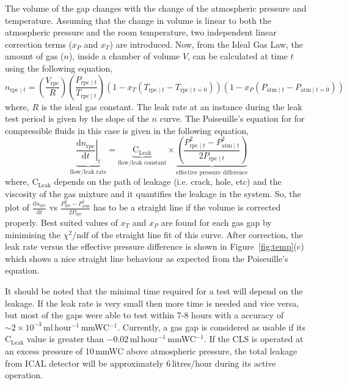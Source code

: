 \documentclass[a4paper,12pt,twoside]{article}
\begin{document}
The volume of the gap changes with the change of the atmospheric pressure and temperature. Assuming that the change in volume is linear to both the atmospheric pressure and the room temperature, two independent linear correction terms ($x_P$ and $x_T$) are introduced. Now, from the Ideal Gas Law, the amount of gas ($n$), inside a chamber of volume $V$, can be calculated at time $t$ using the following equation,
\begin{equation}
  n_{\textrm{rpc}\mid t}=\left(\frac{V_{\textrm{rpc}}}{R}\right)\left(\frac{P_{\textrm{rpc}\mid t}}{T_{\textrm{rpc}\mid t}}\right)\left(1-x_T\left(T_{\textrm{rpc}\mid t}-T_{\textrm{rpc}\mid t=0}\right)\right)\left(1-x_P\left(P_{\textrm{atm}\mid t}-P_{\textrm{atm}\mid t=0}\right)\right) \label{eq:ct}
\end{equation}
where, $R$ is the ideal gas constant. The leak rate at an instance during the leak test period is given by the slope of the $n$ curve. The Poiseuille's equation\cite{poiseuille} for for compressible fluids in this case is given in the following equation,
\begin{equation}
  \underbrace{\left.\frac{\mathrm{d}n_{\textrm{rpc}}}{\mathrm{d}t}\right| _t}_\text{flow/leak rate}=\underbrace{\textrm{C}_{\textrm{Leak}}}_\text{flow/leak constant}\times\underbrace{\left(\frac {P_{{\textrm{rpc}\mid t} }^{2}-P_{{\textrm{atm}\mid t} }^{2}}{2P_{{\textrm{rpc}\mid t} }}\right)}_\text{effective pressure difference}\label{eq:poiseuille}
\end{equation}
where, $\textrm{C}_{\textrm{Leak}}$ depends on the path of leakage (i.e. crack, hole, etc) and the viscosity of the gas mixture and it quantifies the leakage in the system. So, the plot of $\frac{\mathrm{d}n_{\textrm{rpc}}}{\mathrm{d}t}$ vs $\frac{P_{\textrm{rpc}}^{2}-P_{\textrm{atm}}^{2}}{2P_{\textrm{rpc}}}$ has to be a straight line if the volume is corrected properly. Best suited values of $x_T$ and $x_P$ are found for each gas gap by minimising the $\chi^2/\textrm{ndf}$ of the straight line fit of this curve. After correction, the leak rate versus the effective pressure difference is shown in Figure~\ref{fig:temp}(c) which shows a nice straight line behaviour as expected from the Poiseuille's equation. 

It should be noted that the minimal time required for a test will depend on the leakage. If the leak rate is very small then more time is needed and vice versa, but most of the gaps were able to test within 7-8 hours with a accuracy of $\sim 2\times 10^{-3}$\,ml\,hour$^{-1}$\,mmWC$^{-1}$.  Currently, a gas gap is considered as usable if its $\textrm{C}_{\textrm{Leak}}$ value is greater than $-0.02$\,ml\,hour$^{-1}$\,mmWC$^{-1}$. If the CLS is operated at an excess pressure of 10\,mmWC above atmospheric pressure, the total leakage from ICAL detector will be approximately 6\,litres/hour during its active operation.
\end{document}
